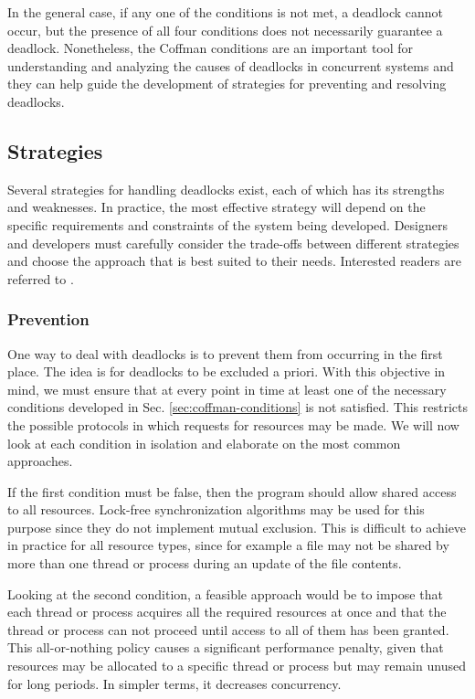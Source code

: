 \documentclass[../Thesis.tex]{subfiles}
\begin{document}
In the general case, if any one of the conditions is not met, a deadlock cannot occur,
but the presence of all four conditions does not necessarily guarantee a deadlock.
Nonetheless, the Coffman conditions are an important tool for understanding and
analyzing the causes of deadlocks in concurrent systems
and they can help guide the development of strategies for preventing and resolving deadlocks.

\subsection{Strategies}

Several strategies for handling deadlocks exist,
each of which has its strengths and weaknesses.
In practice, the most effective strategy will depend on the specific requirements
and constraints of the system being developed.
Designers and developers must carefully consider the trade-offs between different strategies
and choose the approach that is best suited to their needs.
Interested readers are referred to \cite{coffman1971deadlocks,singhal1989deadlock}.

\subsubsection{Prevention}

One way to deal with deadlocks is to prevent them from occurring in the first place.
The idea is for deadlocks to be excluded a priori.
With this objective in mind, we must ensure that at every point in time
at least one of the necessary conditions developed in Sec. \ref{sec:coffman-conditions}
is not satisfied.
This restricts the possible protocols in which requests for resources may be made.
We will now look at each condition in isolation
and elaborate on the most common approaches.

If the first condition must be false,
then the program should allow shared access to all resources.
Lock-free synchronization algorithms may be used for this purpose
since they do not implement mutual exclusion.
This is difficult to achieve in practice for all resource types,
since for example a file may not be shared by more than one thread or process
during an update of the file contents.

Looking at the second condition, a feasible approach would be to impose that
each thread or process acquires all the required resources at once and that
the thread or process can not proceed until access to all of them has been granted.
This all-or-nothing policy causes a significant performance penalty,
given that resources may be allocated to a specific thread or process
but may remain unused for long periods.
In simpler terms, it decreases concurrency.
\end{document}
